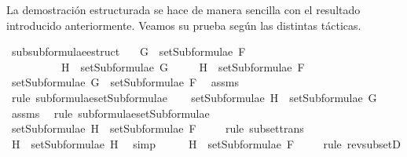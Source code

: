 \begin{isabellebody}
\begin{isamarkuptext}
La demostración estructurada se hace de manera sencilla con el resultado introducido anteriormente. 
Veamos su prueba según las distintas tácticas.%
\end{isamarkuptext}\isamarkuptrue%
\isamarkupfalse%
\ subsubformulae{\isacharunderscore}estruct{\isacharcolon}\isanewline
\ \ \ {\isachardoublequoteopen}G\ {\isasymin}\ setSubformulae\ F{\isachardoublequoteclose}\ \isanewline
\ \ \ \ \ \ \ \ \ \ {\isachardoublequoteopen}H\ {\isasymin}\ setSubformulae\ G{\isachardoublequoteclose}\isanewline
\ \ \ \ \ {\isachardoublequoteopen}H\ {\isasymin}\ setSubformulae\ F{\isachardoublequoteclose}\isanewline
%
\isadelimproof
%
\endisadelimproof
%
\isatagproof
{}\isamarkupfalse%
\ {\isacharminus}\isanewline
\ \ \isamarkupfalse%
\ {}{\isacharcolon}{\isachardoublequoteopen}setSubformulae\ G\ {\isasymsubseteq}\ setSubformulae\ F{\isachardoublequoteclose}\ \isamarkupfalse%
\ assms{\isacharparenleft}{}{\isacharparenright}\ \isamarkupfalse%
\ {\isacharparenleft}rule\ subformulae{\isacharunderscore}setSubformulae{\isacharparenright}\isanewline
\ \ \isamarkupfalse%
\ {\isachardoublequoteopen}setSubformulae\ H\ {\isasymsubseteq}\ setSubformulae\ G{\isachardoublequoteclose}\ \isamarkupfalse%
\ assms{\isacharparenleft}{}{\isacharparenright}\ \isamarkupfalse%
\ {\isacharparenleft}rule\ subformulae{\isacharunderscore}setSubformulae{\isacharparenright}\isanewline
\ \ \isamarkupfalse%
\ \isamarkupfalse%
\ {}{\isacharcolon}{\isachardoublequoteopen}setSubformulae\ H\ {\isasymsubseteq}\ setSubformulae\ F{\isachardoublequoteclose}\ \isamarkupfalse%
\ {}\ \isamarkupfalse%
\ {\isacharparenleft}rule\ subset{\isacharunderscore}trans{\isacharparenright}\isanewline
\ \ \isamarkupfalse%
\ {\isachardoublequoteopen}H\ {\isasymin}\ setSubformulae\ H{\isachardoublequoteclose}\ \isamarkupfalse%
\ simp\isanewline
\ \ \isamarkupfalse%
\ \isamarkupfalse%
\ {\isachardoublequoteopen}H\ {\isasymin}\ setSubformulae\ F{\isachardoublequoteclose}\ \isamarkupfalse%
\ {}\ \isamarkupfalse%
\ {\isacharparenleft}rule\ rev{\isacharunderscore}subsetD{\isacharparenright}\isanewline
{}\isamarkupfalse%
%
\endisatagproof
{\isafoldproof}%
%
\isadelimproof
\isanewline
%
\endisadelimproof

\end{isabellebody}
